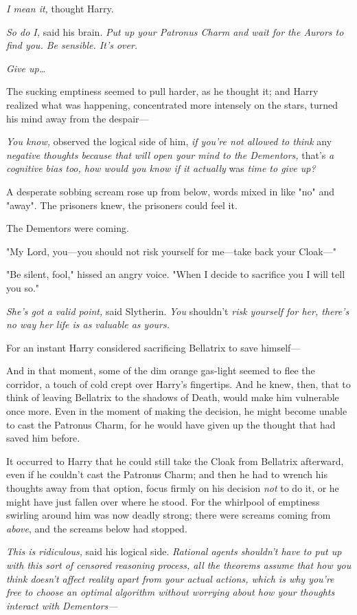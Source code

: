 \emph{I mean it,} thought Harry.

\emph{So do I,} said his brain. \emph{Put up your Patronus Charm and wait for 
the Aurors to find you. Be sensible. It's over.}

\emph{Give up{\ldots}}

The sucking emptiness seemed to pull harder, as he thought it; and Harry 
realized what was happening, concentrated more intensely on the stars, turned 
his mind away from the despair---

\emph{You know,} observed the logical side of him, \emph{if you're not allowed 
to think} any \emph{negative thoughts because that will open your mind to the 
Dementors,} that's\emph{ a cognitive bias too, how would you know if it 
actually} was\emph{ time to give up?}

A desperate sobbing scream rose up from below, words mixed in like "no" and 
"away". The prisoners knew, the prisoners could feel it.

The Dementors were coming.

"My Lord, you---you should not risk yourself for me---take back your Cloak---"

"Be silent, fool," hissed an angry voice. "When I decide to sacrifice you I 
will tell you so."

\emph{She's got a valid point,} said Slytherin. \emph{You} shouldn't\emph{ risk 
yourself for her, there's no way her life is as valuable as yours.}

For an instant Harry considered sacrificing Bellatrix to save himself---

And in that moment, some of the dim orange gas-light seemed to flee the 
corridor, a touch of cold crept over Harry's fingertips. And he knew, then, 
that to think of leaving Bellatrix to the shadows of Death, would make him 
vulnerable once more. Even in the moment of making the decision, he might 
become unable to cast the Patronus Charm, for he would have given up the 
thought that had saved him before.

It occurred to Harry that he could still take the Cloak from Bellatrix 
afterward, even if he couldn't cast the Patronus Charm; and then he had to 
wrench his thoughts away from that option, focus firmly on his decision 
\emph{not} to do it, or he might have just fallen over where he stood. For the 
whirlpool of emptiness swirling around him was now deadly strong; there were 
screams coming from \emph{above}, and the screams below had stopped.

\emph{This is ridiculous,} said his logical side. \emph{Rational agents 
shouldn't have to put up with this sort of censored reasoning process, all the 
theorems assume that how you think doesn't affect reality apart from your 
actual actions, which is why you're free to choose an optimal algorithm without 
worrying about how your thoughts interact with Dementors---}

